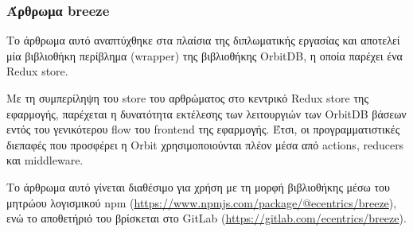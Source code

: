 \subsubsection{Άρθρωμα breeze} \label{subsubsection:4-3-1-breeze-unit}

Το άρθρωμα αυτό αναπτύχθηκε στα πλαίσια της διπλωματικής εργασίας και αποτελεί μία βιβλιοθήκη περίβλημα (wrapper) της βιβλιοθήκης OrbitDB, η οποία παρέχει ένα Redux store. 

Με τη συμπερίληψη του store του αρθρώματος στο κεντρικό Redux store της εφαρμογής, παρέχεται η δυνατότητα εκτέλεσης των λειτουργιών των OrbitDB βάσεων εντός του γενικότερου flow του frontend της εφαρμογής. Έτσι, οι προγραμματιστικές διεπαφές που προσφέρει η Orbit χρησιμοποιούνται πλέον μέσα από actions, reducers και middleware.

Το άρθρωμα αυτό γίνεται διαθέσιμο για χρήση με τη μορφή βιβλιοθήκης μέσω του μητρώου λογισμικού npm (\url{https://www.npmjs.com/package/@ecentrics/breeze}), ενώ το αποθετήριό του βρίσκεται στο GitLab (\url{https://gitlab.com/ecentrics/breeze}).
